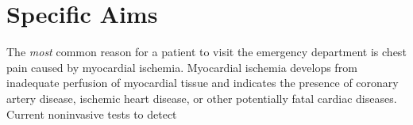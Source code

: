 %


%

\section{Specific Aims}

The \textit{most} common reason for a patient to visit the emergency
department is chest pain caused by myocardial ischemia. Myocardial ischemia
develops from inadequate perfusion of myocardial tissue and indicates the
presence of coronary artery disease, ischemic heart disease, or other
potentially fatal cardiac diseases. Current noninvasive tests to detect


